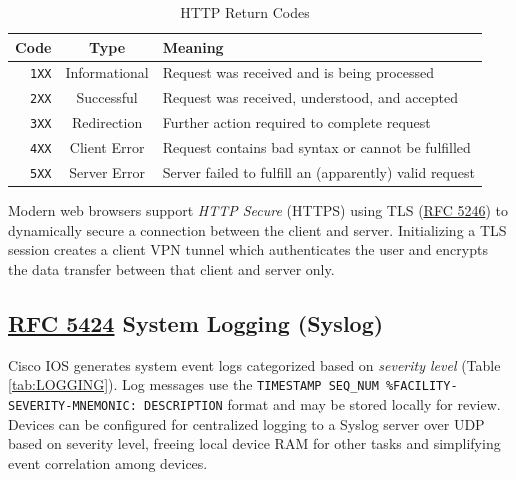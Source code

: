 \documentclass[12pt]{article}
\newcommand{\RFC}[1]{\href{https://datatracker.ietf.org/doc/html/rfc#1}{RFC #1}}
\begin{document}
	\begin{table}[H]
	\centering
	\caption{HTTP Return Codes \label{tab:HTTP CODES}}
	\begin{tabular}{r | c | l}
	\hline
	\textbf{Code}	& \textbf{Type}	& \textbf{Meaning}\\\hline
	\texttt{1XX}			& Informational			& Request was received and is being processed\\\hline
	\texttt{2XX}			& Successful			& Request was received, understood, and accepted\\\hline
	\texttt{3XX}			& Redirection			& Further action required to complete request\\\hline
	\texttt{4XX}			& Client Error			& Request contains bad syntax or cannot be fulfilled\\\hline
	\texttt{5XX}			& Server Error			& Server failed to fulfill an (apparently) valid request\\\hline
	\end{tabular}\end{table}
	Modern web browsers support \textit{HTTP Secure} (HTTPS) using TLS (\RFC{5246}) to dynamically secure a connection between the client and server. Initializing a TLS session creates a client VPN tunnel which authenticates the user and encrypts the data transfer between that client and server only.


	\subsection[RFC 5424 Syslog]{\RFC{5424} System Logging (Syslog) \label{subsec:SYSLOG}}
	Cisco IOS generates system event logs categorized based on \textit{severity level} (Table \ref{tab:LOGGING}). Log messages use the \texttt{TIMESTAMP SEQ\_NUM \%FACILITY-SEVERITY-MNEMONIC: DESCRIPTION} format and may be stored locally for review. Devices can be configured for centralized logging to a Syslog server over UDP based on severity level, freeing local device RAM for other tasks and simplifying event correlation among devices.
\end{document}
